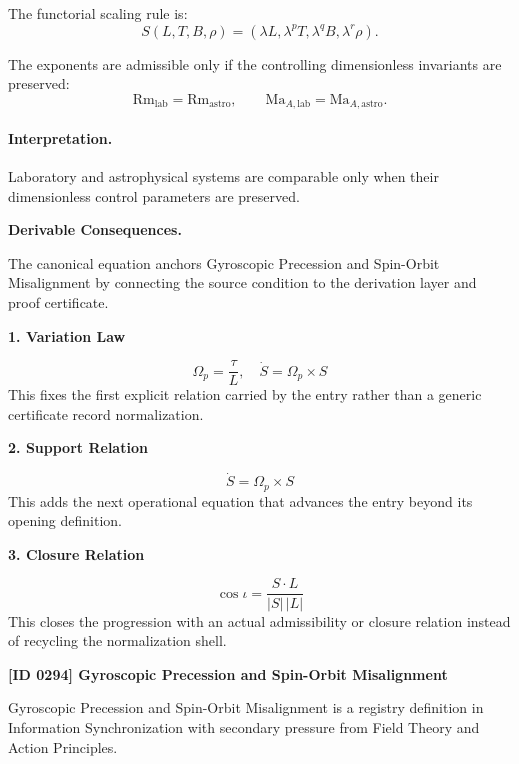 The functorial scaling rule is:
\begin{equation}
S(L,T,B,\rho)
=
(\lambda L,\lambda^{p}T,\lambda^{q}B,\lambda^{r}\rho).
\end{equation}

The exponents are admissible only if the controlling dimensionless invariants are preserved:
\begin{equation}
\boxed{
\mathrm{Rm}_{\mathrm{lab}}=\mathrm{Rm}_{\mathrm{astro}},
\qquad
\mathrm{Ma}_{A,\mathrm{lab}}=\mathrm{Ma}_{A,\mathrm{astro}}.
}
\end{equation}

\paragraph{Interpretation.}
Laboratory and astrophysical systems are comparable only when their dimensionless control parameters are preserved.

\par\vspace{0.35em}
\noindent\textbf{Derivable Consequences.}\quad
\begingroup
\footnotesize
\raggedright
The canonical equation anchors Gyroscopic Precession and Spin-Orbit Misalignment by connecting the source condition to the derivation layer and proof certificate.
\par\endgroup

\noindent\textbf{1. Variation Law}\par
\[
\Omega_p=\frac{\tau}{L},
\quad
\dot{S}=\Omega_p\times S
\]
\noindent This fixes the first explicit relation carried by the entry rather than a generic certificate record normalization.\par
\noindent\textbf{2. Support Relation}\par
\[
\dot{S}=\Omega_p\times S
\]
\noindent This adds the next operational equation that advances the entry beyond its opening definition.\par
\noindent\textbf{3. Closure Relation}\par
\[
\cos\iota=\frac{S\cdot L}{|S|\,|L|}
\]
\noindent This closes the progression with an actual admissibility or closure relation instead of recycling the normalization shell.\par

\clearpage
\noindent\textbf{[ID 0294] Gyroscopic Precession and Spin-Orbit Misalignment}\par
\vspace{0.35em}
\begingroup\small
{}
Gyroscopic Precession and Spin-Orbit Misalignment is a registry definition in Information Synchronization with secondary pressure from Field Theory and Action Principles.


